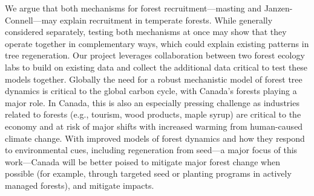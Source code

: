 \documentclass[12pt,oneside]{article}
\begin{document}
We argue that both mechanisms for forest recruitment---masting and Janzen-Connell---may explain recruitment in temperate forests. While generally considered separately,\cite{bogdziewicz2024evolutionary} testing both mechanisms at once may show that they operate together in complementary ways, which could explain existing patterns in tree regeneration. Our project leverages collaboration between two forest ecology labs to build on existing data and collect the additional data critical to test these models together. 
Globally the need for a robust mechanistic model of forest tree dynamics is critical to the global carbon cycle, with Canada's forests playing a major role.\cite{ipcc2021,friedlingstein2022global} In Canada, this is also an especially pressing challenge as industries related to forests (e.g., tourism, wood products, maple syrup) are critical to the economy and at risk of major shifts with increased warming from human-caused climate change. With improved models of forest dynamics and how they respond to environmental cues, including regeneration from seed---a major focus of this work---Canada will be better poised to mitigate major forest change when possible (for example, through targeted seed or planting programs in actively managed forests), and mitigate impacts. 

\end{document}
